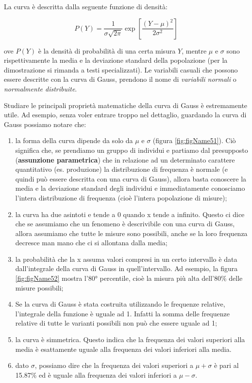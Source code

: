 \documentclass[a4paper,12pt,oneside]{book}
\providecommand{\tightlist}{%
  \setlength{\itemsep}{0pt}\setlength{\parskip}{0pt}}
\begin{document}
La curva è descritta dalla seguente funzione di densità:

\[P(Y) = \frac{1}{{\sigma \sqrt {2\pi } }}\exp \left[{\frac{\left( {Y - \mu } \right)^2 }{2\sigma ^2 }} \right]\]

ove \(P(Y)\) è la densità di probabilità di una certa misura \(Y\), mentre \(\mu\) e \(\sigma\) sono rispettivamente la media e la deviazione standard della popolazione (per la dimostrazione si rimanda a testi specializzati). Le variabili casuali che possono essere descritte con la curva di Gauss, prendono il nome di \emph{variabili normali} o \emph{normalmente distribuite}.

Studiare le principali proprietà matematiche della curva di Gauss è estremamente utile. Ad esempio, senza voler entrare troppo nel dettaglio, guardando la curva di Gauss possiamo notare che:

\begin{enumerate}
\def\labelenumi{\arabic{enumi}.}
\tightlist
\item
  la forma della curva dipende da solo da \(\mu\) e \(\sigma\) (figura \ref{fig:figName51}). Ciò significa che, se prendiamo un gruppo di individui e partiamo dal presupposto (\textbf{assunzione parametrica}) che in relazione ad un determinato carattere quantitativo (es. produzione) la distribuzione di frequenza è normale (e quindi può essere descritta con una curva di Gauss), allora basta conoscere la media e la deviazione standard degli individui e immediatamente conosciamo l'intera distribuzione di frequenza (cioè l'intera popolazione di misure);
\item
  la curva ha due asintoti e tende a 0 quando x tende a infinito. Questo ci dice che se assumiamo che un fenomeno è descrivibile con una curva di Gauss, allora assumiamo che tutte le misure sono possibili, anche se la loro frequenza decresce man mano che ci si allontana dalla media;
\item
  la probabilità che la x assuma valori compresi in un certo intervallo è data dall'integrale della curva di Gauss in quell'intervallo. Ad esempio, la figura \ref{fig:figName52} mostra l'80° percentile, cioè la misura più alta dell'80\% delle misure possibili;
\item
  Se la curva di Gauss è stata costruita utilizzando le frequenze relative, l'integrale della funzione è uguale ad 1. Infatti la somma delle frequenze relative di tutte le varianti possibili non può che essere uguale ad 1;
\item
  la curva è simmetrica. Questo indica che la frequenza dei valori superiori alla media è esattamente uguale alla frequenza dei valori inferiori alla media.
\item
  dato \(\sigma\), possiamo dire che la frequenza dei valori superiori a \(\mu + \sigma\) è pari al 15.87\% ed è uguale alla frequenza dei valori inferiori a \(\mu - \sigma\).
\end{enumerate}
\end{document}
